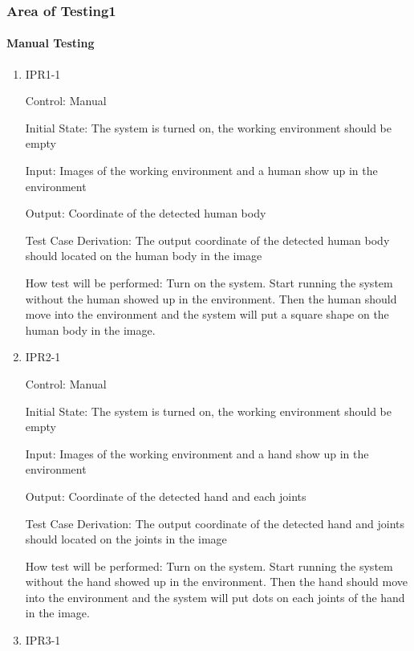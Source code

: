 \documentclass[12pt, titlepage]{article}
\begin{document}
\subsubsection{Area of Testing1}
		
\paragraph{Manual Testing}

\begin{enumerate}

\item{IPR1-1\\}

Control: Manual
					
Initial State: The system is turned on, the working environment should be empty
					
Input: Images of the working environment and a human show up in the environment
					
Output: Coordinate of the detected human body

Test Case Derivation: The output coordinate of the detected human body should located on the human body in the image
					
How test will be performed: Turn on the system. Start running the system without the human showed up in the environment. Then the human should move into the environment and the system will put a square shape on the human body in the image.


\item{IPR2-1\\}

Control: Manual
					
Initial State: The system is turned on, the working environment should be empty
					
Input: Images of the working environment and a hand show up in the environment
					
Output: Coordinate of the detected hand and each joints

Test Case Derivation: The output coordinate of the detected hand and joints should located on the joints in the image
					
How test will be performed: Turn on the system. Start running the system without the hand showed up in the environment. Then the hand should move into the environment and the system will put dots on each joints of the hand in the image.

\item{IPR3-1\\}


\end{enumerate}
\end{document}

